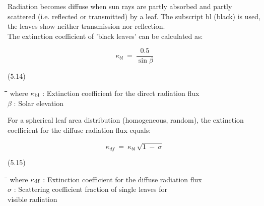 \documentclass[11pt]{article}
\begin{document}
\bigskip
\bigskip
Radiation becomes diffuse when sun rays are partly absorbed and partly scattered (i.e.
reflected or transmitted) by a leaf. The subscript bl (black) is used, the leaves show
neither transmis\-sion nor reflection. \\
The extinction coefficient of 'black leaves' can be calculat\-ed as:

\begin{displaymath}
\kappa _{bl} ~=~{\frac{0.5}{\sin \beta }}
\end{displaymath}

 \bigskip
\strut\hfill (5.14)

\nwln
\begin{tabbing}
\hspace{1.27cm}\=\hspace{1.27cm}\=\hspace{1.27cm}\=\hspace{1.27cm}\=%
\hspace{1.27cm}\=\hspace{1.27cm}\=\hspace{1.27cm}\=\hspace{1.27cm}\=%
\hspace{1.27cm}\=\hspace{1.27cm}\=\kill
where\> $\kappa$$_{{\rm bl}}$\> : Extinction coefficient for the direct radiation flux\> \> \> \> \> \> \> \> [-]\\
\>$\beta$\> : Solar elevation\> \> \> \> \> \> \> \> [degree]
\end{tabbing}

\bigskip
\bigskip
For a spherical leaf area distribution (homogeneous, random), the extinction coefficient
for the diffuse radiation flux equals:

\begin{displaymath}
 \kappa _{df} ~=~ \kappa _{bl} \, \sqrt{1~-~ \sigma }
\end{displaymath}

 \bigskip
\strut\hfill (5.15)
\nwln
\begin{tabbing}
\hspace{1.27cm}\=\hspace{1.27cm}\=\hspace{1.27cm}\=\hspace{1.27cm}\=%
\hspace{1.27cm}\=\hspace{1.27cm}\=\hspace{1.27cm}\=\hspace{1.27cm}\=%
\hspace{1.27cm}\=\hspace{1.27cm}\=\kill
where\> $\kappa$$_{{\rm df}}$\> : Extinction coefficient for the diffuse radiation flux\> \> \> \> \> \> \> \> [-]\\
\>$\sigma$\> : Scattering coefficient fraction of single leaves for \\
\>\>   visible radiation\> \> \> \> \> \> \> \> [-]
\end{tabbing}
\end{document}
